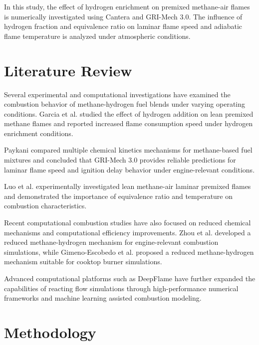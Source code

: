 \documentclass[conference]{IEEEtran}
\begin{document}
In this study, the effect of hydrogen enrichment on premixed methane-air flames is numerically investigated using Cantera and GRI-Mech 3.0. The influence of hydrogen fraction and equivalence ratio on laminar flame speed and adiabatic flame temperature is analyzed under atmospheric conditions.


\section{Literature Review}

Several experimental and computational investigations have examined the combustion behavior of methane-hydrogen fuel blends under varying operating conditions. Garcia et al. \cite{Garcia_2023} studied the effect of hydrogen addition on lean premixed methane flames and reported increased flame consumption speed under hydrogen enrichment conditions.

Paykani \cite{en14102834} compared multiple chemical kinetics mechanisms for methane-based fuel mixtures and concluded that GRI-Mech 3.0 provides reliable predictions for laminar flame speed and ignition delay behavior under engine-relevant conditions.

Luo et al. \cite{doi:10.1021/acsomega.1c01692} experimentally investigated lean methane-air laminar premixed flames and demonstrated the importance of equivalence ratio and temperature on combustion characteristics.

Recent computational combustion studies have also focused on reduced chemical mechanisms and computational efficiency improvements. Zhou et al. \cite{Zhou2021-eq} developed a reduced methane-hydrogen mechanism for engine-relevant combustion simulations, while Gimeno-Escobedo et al. \cite{GIMENOESCOBEDO201927123} proposed a reduced methane-hydrogen mechanism suitable for cooktop burner simulations.

Advanced computational platforms such as DeepFlame \cite{Mao_2023} have further expanded the capabilities of reacting flow simulations through high-performance numerical frameworks and machine learning assisted combustion modeling.


\section{Methodology}
\end{document}
